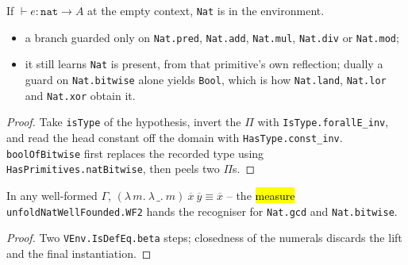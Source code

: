 \begin{lemma}
\label{vpc:thm:prim-contains-nat}
\leanok
{}

 If $\vdash e : \mathtt{nat} \to A$ at the empty context, \texttt{Nat} is in the
environment.
\begin{itemize}
\item {} a branch guarded only on \texttt{Nat.pred}, \texttt{Nat.add}, \texttt{Nat.mul},
\texttt{Nat.div} or \texttt{Nat.mod};
\item {} it still learns \texttt{Nat} is present, from that primitive's own reflection;
dually a guard on \texttt{Nat.bitwise} alone yields \texttt{Bool}, which is how
\texttt{Nat.land}, \texttt{Nat.lor} and \texttt{Nat.xor} obtain it.
\end{itemize}
\end{lemma}
\begin{proof}\leanok
{}
 Take \texttt{isType} of the hypothesis, invert the $\Pi$ with
\texttt{IsType.forallE\_inv}, and read the head constant off the domain with
\texttt{HasType.const\_inv}. \texttt{boolOfBitwise} first replaces the recorded type using
\texttt{HasPrimitives.natBitwise}, then peels two $\Pi$s.
\end{proof}

\begin{lemma}
\label{vpc:lem:prim-natfstlamapp}\leanok
{}

 In any well-formed $\Gamma$, $(\lambda\, m.\ \lambda\, \_.\ m)\ \overline{x}\
\overline{y} \equiv \overline{x}$ -- the \hl{measure} \texttt{unfoldNatWellFounded.WF2} hands the
recogniser for \texttt{Nat.gcd} and \texttt{Nat.bitwise}.
\end{lemma}
\begin{proof}\leanok
{}
 Two \texttt{VEnv.IsDefEq.beta} steps; closedness of the numerals discards the lift and
the final instantiation.
\end{proof}

